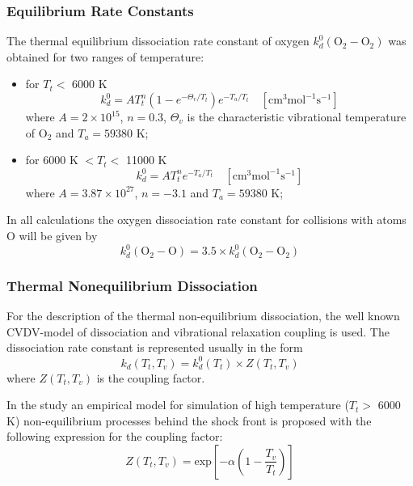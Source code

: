 \documentclass[10pt]{beamer}
\begin{document}
\begin{frame}
\frametitle{Equilibrium Rate Constants}
The thermal equilibrium dissociation rate constant of oxygen
$k_d^0\left(\text{O}_2-\text{O}_2\right)$ was obtained for two ranges of
temperature:
\begin{itemize}
	\item for $T_t<$ 6000 K
	\begin{equation*}
	k_d^0=AT_t^n\left(1-e^{-\Theta_v/T_t}\right)e^{-T_a/T_t}\quad\left[\text{cm}^3\text{mol}^{-1}\text{s}^{-1}\right]
	\end{equation*}
	where $A=2\times10^{15}$, $n=0.3$, $\Theta_v$ is the characteristic vibrational temperature of O$_2$ and $T_a=59380$ K;
	\item for 6000 K $<T_t<$ 11000 K
	\begin{equation*}
	k_d^0=AT_t^ne^{-T_a/T_t}\quad\left[\text{cm}^3\text{mol}^{-1}\text{s}^{-1}\right]
	\end{equation*}
	where $A=3.87\times10^{27}$, $n=-3.1$ and $T_a=59380$ K;
\end{itemize}

In all calculations the oxygen dissociation rate constant for collisions with
atoms O will be given by
\begin{equation*}
k_d^0\left(\text{O}_2-\text{O}\right)=3.5\times k_d^0\left(\text{O}_2-\text{O}_2\right)
\end{equation*}
\end{frame}

\begin{frame}
\frametitle{Thermal Nonequilibrium Dissociation}
For the description of the thermal non-equilibrium dissociation, the well known
CVDV-model of dissociation and vibrational relaxation coupling is used. The
dissociation rate constant is represented usually in the form
\begin{equation*}
k_d\left(T_t,T_v\right)=k_d^0\left(T_t\right)\times Z\left(T_t,T_v\right)
\end{equation*}
where $Z\left(T_t,T_v\right)$ is the coupling factor.

In the study an empirical model for simulation of high temperature ($T_t>$ 6000
K) non-equilibrium processes behind the shock front is proposed with the
following expression for the coupling factor:
\begin{equation*}
Z\left(T_t,T_v\right)=\text{exp}\left[-\alpha\left(1-\frac{T_v}{T_t}\right)\right]
\end{equation*}
\end{frame}
\end{document}
